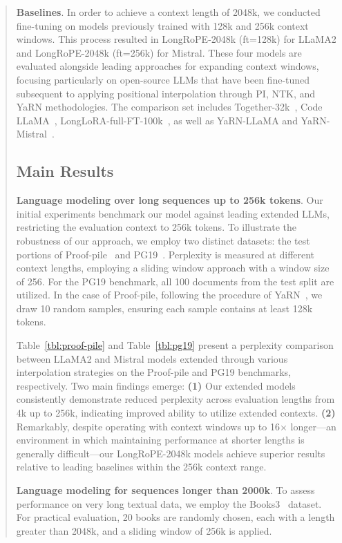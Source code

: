 \begin{abstract}
\textbf{Baselines}. In order to achieve a context length of 2048k, we conducted fine-tuning on models previously trained with 128k and 256k context windows. This process resulted in LongRoPE-2048k (ft=128k) for LLaMA2 and LongRoPE-2048k (ft=256k) for Mistral. These four models are evaluated alongside leading approaches for expanding context windows, focusing particularly on open-source LLMs that have been fine-tuned subsequent to applying positional interpolation through PI, NTK, and YaRN methodologies. The comparison set includes Together-32k~\cite{together}, Code LLaMA~\cite{codellama}, LongLoRA-full-FT-100k~\cite{longlora}, as well as YaRN-LLaMA and YaRN-Mistral~\cite{yarn}.

\subsection{Main Results}

\label{sec:mainresult}
\textbf{Language modeling over long sequences up to 256k tokens}. Our initial experiments benchmark our model against leading extended LLMs, restricting the evaluation context to 256k tokens. To illustrate the robustness of our approach, we employ two distinct datasets: the test portions of Proof-pile~\cite{pg19} and PG19~\cite{pile}. Perplexity is measured at different context lengths, employing a sliding window approach with a window size of 256. For the PG19 benchmark, all 100 documents from the test split are utilized. In the case of Proof-pile, following the procedure of YaRN~\cite{yarn}, we draw 10 random samples, ensuring each sample contains at least 128k tokens.

Table~\ref{tbl:proof-pile} and Table~\ref{tbl:pg19} present a perplexity comparison between LLaMA2 and Mistral models extended through various interpolation strategies on the Proof-pile and PG19 benchmarks, respectively. Two main findings emerge: \textbf{(1)} Our extended models consistently demonstrate reduced perplexity across evaluation lengths from 4k up to 256k, indicating improved ability to utilize extended contexts. \textbf{(2)} Remarkably, despite operating with context windows up to 16$\times$ longer—an environment in which maintaining performance at shorter lengths is generally difficult—our LongRoPE-2048k models achieve superior results relative to leading baselines within the 256k context range.

\textbf{Language modeling for sequences longer than 2000k}. To assess performance on very long textual data, we employ the Books3~\cite{pile} dataset. For practical evaluation, 20 books are randomly chosen, each with a length greater than 2048k, and a sliding window of 256k is applied.


\end{abstract}
